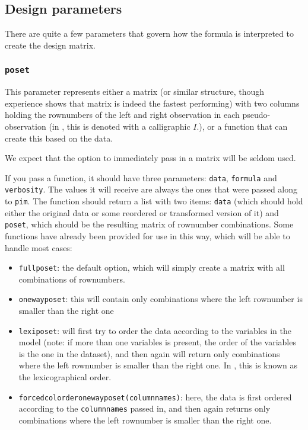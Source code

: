\documentclass[12pt]{article}
\newcommand{\pim}[1]{\texttt{#1}}%
\newcommand{\cd}[1]{\texttt{#1}}%
\begin{document}
\subsection{Design parameters}\label{SS_design}
There are quite a few parameters that govern how the formula is interpreted to create the design matrix.
\subsubsection{\cd{poset}}
This parameter represents either a matrix (or similar structure, though experience shows that matrix is indeed the fastest performing) with two columns holding the rownumbers of the left and right observation in each pseudo-observation (in \cite{Thas2012}, this is denoted with a calligraphic $I$.), or a function that can create this based on the data.

We expect that the option to immediately pass in a matrix will be seldom used.

If you pass a function, it should have three parameters: \cd{data}, \cd{formula} and \cd{verbosity}. The values it will receive are always the ones that were passed along to \pim{pim}. The function should return a list with two items: \cd{data} (which should hold either the original data or some reordered or transformed version of it) and \cd{poset}, which should be the resulting matrix of rownumber combinations. Some functions have already been provided for use in this way, which will be able to handle most cases:
\begin{itemize}
	\item \pim{fullposet}: the default option, which will simply create a matrix with all combinations of rownumbers.
	\item \pim{onewayposet}: this will contain only combinations where the left rownumber is smaller than the right one
	\item \pim{lexiposet}: will first try to order the data according to the variables in the model (note: if more than one variables is present, the order of the variables is the one in the dataset), and then again will return only combinations where the left rownumber is smaller than the right one. In \cite{Thas2012}, this is known as the lexicographical order.
	\item \pim{forcedcolorderonewayposet}\cd{(columnnames)}: here, the data is first ordered according to the \cd{columnnames} passed in, and then again returns only combinations where the left rownumber is smaller than the right one.
\end{itemize}
\end{document}
